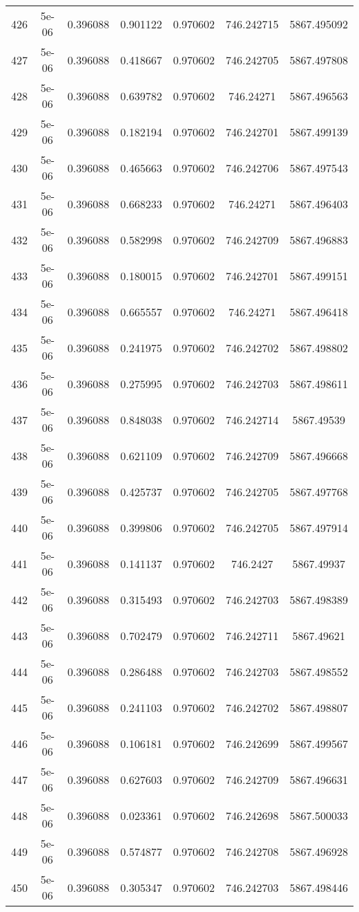 \begin{table}
\begin{tabular*}{\linewidth}{c|c|c|c|c|c|c}
426 & 5e-06 & 0.396088 & 0.901122 & 0.970602 & 746.242715 & 5867.495092\\
427 & 5e-06 & 0.396088 & 0.418667 & 0.970602 & 746.242705 & 5867.497808\\
428 & 5e-06 & 0.396088 & 0.639782 & 0.970602 & 746.24271 & 5867.496563\\
429 & 5e-06 & 0.396088 & 0.182194 & 0.970602 & 746.242701 & 5867.499139\\
430 & 5e-06 & 0.396088 & 0.465663 & 0.970602 & 746.242706 & 5867.497543\\
431 & 5e-06 & 0.396088 & 0.668233 & 0.970602 & 746.24271 & 5867.496403\\
432 & 5e-06 & 0.396088 & 0.582998 & 0.970602 & 746.242709 & 5867.496883\\
433 & 5e-06 & 0.396088 & 0.180015 & 0.970602 & 746.242701 & 5867.499151\\
434 & 5e-06 & 0.396088 & 0.665557 & 0.970602 & 746.24271 & 5867.496418\\
435 & 5e-06 & 0.396088 & 0.241975 & 0.970602 & 746.242702 & 5867.498802\\
436 & 5e-06 & 0.396088 & 0.275995 & 0.970602 & 746.242703 & 5867.498611\\
437 & 5e-06 & 0.396088 & 0.848038 & 0.970602 & 746.242714 & 5867.49539\\
438 & 5e-06 & 0.396088 & 0.621109 & 0.970602 & 746.242709 & 5867.496668\\
439 & 5e-06 & 0.396088 & 0.425737 & 0.970602 & 746.242705 & 5867.497768\\
440 & 5e-06 & 0.396088 & 0.399806 & 0.970602 & 746.242705 & 5867.497914\\
441 & 5e-06 & 0.396088 & 0.141137 & 0.970602 & 746.2427 & 5867.49937\\
442 & 5e-06 & 0.396088 & 0.315493 & 0.970602 & 746.242703 & 5867.498389\\
443 & 5e-06 & 0.396088 & 0.702479 & 0.970602 & 746.242711 & 5867.49621\\
444 & 5e-06 & 0.396088 & 0.286488 & 0.970602 & 746.242703 & 5867.498552\\
445 & 5e-06 & 0.396088 & 0.241103 & 0.970602 & 746.242702 & 5867.498807\\
446 & 5e-06 & 0.396088 & 0.106181 & 0.970602 & 746.242699 & 5867.499567\\
447 & 5e-06 & 0.396088 & 0.627603 & 0.970602 & 746.242709 & 5867.496631\\
448 & 5e-06 & 0.396088 & 0.023361 & 0.970602 & 746.242698 & 5867.500033\\
449 & 5e-06 & 0.396088 & 0.574877 & 0.970602 & 746.242708 & 5867.496928\\
450 & 5e-06 & 0.396088 & 0.305347 & 0.970602 & 746.242703 & 5867.498446\\
\end{tabular*}
\end{table}
